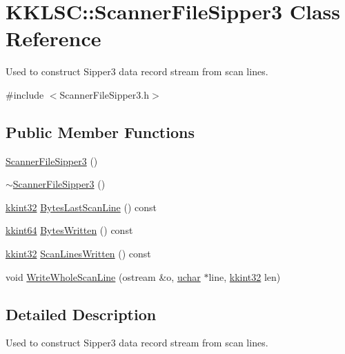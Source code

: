\hypertarget{class_k_k_l_s_c_1_1_scanner_file_sipper3}{}\section{K\+K\+L\+SC\+:\+:Scanner\+File\+Sipper3 Class Reference}
\label{class_k_k_l_s_c_1_1_scanner_file_sipper3}


Used to construct Sipper3 data record stream from scan lines.  




{\ttfamily \#include $<$Scanner\+File\+Sipper3.\+h$>$}

\subsection*{Public Member Functions}
\begin{DoxyCompactItemize}
\item 
\hyperlink{class_k_k_l_s_c_1_1_scanner_file_sipper3_a4f60b2e49f61ff36a350d3d8810b3fbb}{Scanner\+File\+Sipper3} ()
\item 
\hyperlink{class_k_k_l_s_c_1_1_scanner_file_sipper3_a8c82854e8556fed9c8f628d4d42acd7e}{$\sim$\+Scanner\+File\+Sipper3} ()
\item 
\hyperlink{namespace_k_k_b_a8fa4952cc84fda1de4bec1fbdd8d5b1b}{kkint32} \hyperlink{class_k_k_l_s_c_1_1_scanner_file_sipper3_a78546e03143e1b2419eeb9bb012b871a}{Bytes\+Last\+Scan\+Line} () const 
\item 
\hyperlink{namespace_k_k_b_aa3486b1c5ea9162b3b020c69f72826eb}{kkint64} \hyperlink{class_k_k_l_s_c_1_1_scanner_file_sipper3_a36bff4bb89ed876ef081b5176e99ac46}{Bytes\+Written} () const 
\item 
\hyperlink{namespace_k_k_b_a8fa4952cc84fda1de4bec1fbdd8d5b1b}{kkint32} \hyperlink{class_k_k_l_s_c_1_1_scanner_file_sipper3_a28663122031000bf89a67ca8e1f1aac8}{Scan\+Lines\+Written} () const 
\item 
void \hyperlink{class_k_k_l_s_c_1_1_scanner_file_sipper3_ad61463be808379fa82305d685def72da}{Write\+Whole\+Scan\+Line} (ostream \&o, \hyperlink{namespace_k_k_b_ace9969169bf514f9ee6185186949cdf7}{uchar} $\ast$line, \hyperlink{namespace_k_k_b_a8fa4952cc84fda1de4bec1fbdd8d5b1b}{kkint32} len)
\end{DoxyCompactItemize}


\subsection{Detailed Description}
Used to construct Sipper3 data record stream from scan lines. 

